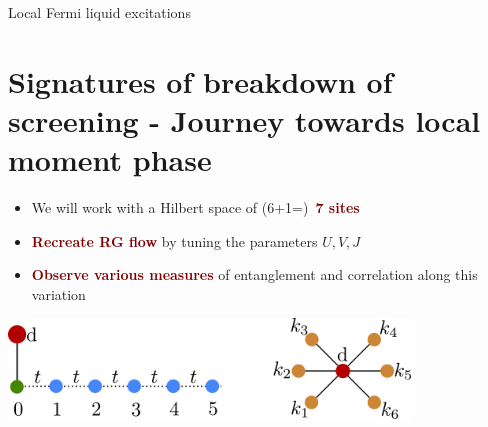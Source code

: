 \documentclass[aspectratio=169]{beamer}
\newcommand{\focus}[1]{\textcolor{maroon}{\textbf{#1}}}
\begin{document}
\begin{frame}[noframenumbering]{Local Fermi liquid excitations}
\begin{minipage}{0.4\textwidth}
\end{minipage}
\end{frame}

\section{Signatures of breakdown of screening - Journey towards local moment phase}

\centering
\begin{frame}[noframenumbering]{}
\begin{itemize}
	\item We will work with a Hilbert space of (6+1=)~\focus{7 sites}
	\item \focus{Recreate RG flow} by tuning the parameters \(U,V,J\)
	\item \focus{Observe various measures} of entanglement and correlation along this variation
\end{itemize}

\vspace*{20pt}
\includegraphics[width=0.8\textwidth]{figures/seven_site.pdf}
\end{frame}
\end{document}

